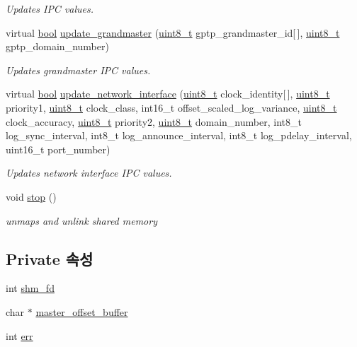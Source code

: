 \begin{DoxyCompactItemize}
\begin{DoxyCompactList}\small\item\em Updates I\+PC values. \end{DoxyCompactList}\item 
virtual \hyperlink{avb__gptp_8h_af6a258d8f3ee5206d682d799316314b1}{bool} \hyperlink{class_linux_shared_memory_i_p_c_ab4218ec21d3322c365b300cfdb23b263}{update\+\_\+grandmaster} (\hyperlink{stdint_8h_aba7bc1797add20fe3efdf37ced1182c5}{uint8\+\_\+t} gptp\+\_\+grandmaster\+\_\+id\mbox{[}$\,$\mbox{]}, \hyperlink{stdint_8h_aba7bc1797add20fe3efdf37ced1182c5}{uint8\+\_\+t} gptp\+\_\+domain\+\_\+number)
\begin{DoxyCompactList}\small\item\em Updates grandmaster I\+PC values. \end{DoxyCompactList}\item 
virtual \hyperlink{avb__gptp_8h_af6a258d8f3ee5206d682d799316314b1}{bool} \hyperlink{class_linux_shared_memory_i_p_c_ad971ad6fa412e49d34a5ca927815e715}{update\+\_\+network\+\_\+interface} (\hyperlink{stdint_8h_aba7bc1797add20fe3efdf37ced1182c5}{uint8\+\_\+t} clock\+\_\+identity\mbox{[}$\,$\mbox{]}, \hyperlink{stdint_8h_aba7bc1797add20fe3efdf37ced1182c5}{uint8\+\_\+t} priority1, \hyperlink{stdint_8h_aba7bc1797add20fe3efdf37ced1182c5}{uint8\+\_\+t} clock\+\_\+class, int16\+\_\+t offset\+\_\+scaled\+\_\+log\+\_\+variance, \hyperlink{stdint_8h_aba7bc1797add20fe3efdf37ced1182c5}{uint8\+\_\+t} clock\+\_\+accuracy, \hyperlink{stdint_8h_aba7bc1797add20fe3efdf37ced1182c5}{uint8\+\_\+t} priority2, \hyperlink{stdint_8h_aba7bc1797add20fe3efdf37ced1182c5}{uint8\+\_\+t} domain\+\_\+number, int8\+\_\+t log\+\_\+sync\+\_\+interval, int8\+\_\+t log\+\_\+announce\+\_\+interval, int8\+\_\+t log\+\_\+pdelay\+\_\+interval, uint16\+\_\+t port\+\_\+number)
\begin{DoxyCompactList}\small\item\em Updates network interface I\+PC values. \end{DoxyCompactList}\item 
void \hyperlink{class_linux_shared_memory_i_p_c_a8c528baf37154d347366083f0f816846}{stop} ()
\begin{DoxyCompactList}\small\item\em unmaps and unlink shared memory \end{DoxyCompactList}\end{DoxyCompactItemize}
\subsection*{Private 속성}
\begin{DoxyCompactItemize}
\item 
int \hyperlink{class_linux_shared_memory_i_p_c_a67ca3e78936424920539c340223a0b0a}{shm\+\_\+fd}
\item 
char $\ast$ \hyperlink{class_linux_shared_memory_i_p_c_a028459163bd8b988344f6837036cb0be}{master\+\_\+offset\+\_\+buffer}
\item 
int \hyperlink{class_linux_shared_memory_i_p_c_a6ce68847c12434f60d1b2654a3dc3409}{err}
\end{DoxyCompactItemize}


